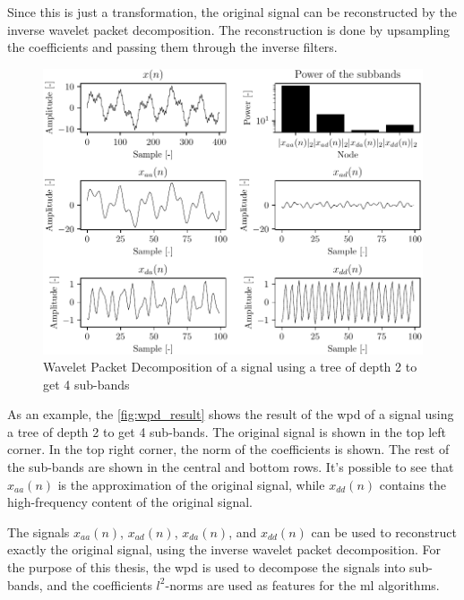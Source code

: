 Since this is just a transformation, the original signal can be reconstructed by the inverse wavelet packet decomposition. The reconstruction is done by upsampling the coefficients and passing them through the inverse filters.


\begin{figure}
\centering
\includegraphics{images/WPD_result.pdf}
\caption{Wavelet Packet Decomposition of a signal using a tree of depth 2 to get 4 sub-bands}
\label{fig:wpd_result}
\end{figure}

As an example, the \autoref{fig:wpd_result} shows the result of the \gls{wpd} of a signal using a tree of depth 2 to get 4 sub-bands. The original signal is shown in the top left corner. In the top right corner, the norm of the coefficients is shown. The rest of the sub-bands are shown in the central and bottom rows. It's possible to see that $x_{aa}(n)$ is the approximation of the original signal, while  $x_{dd}(n)$ contains the high-frequency content of the original signal. 

The signals $x_{aa}(n)$, $x_{ad}(n)$, $x_{da}(n)$, and $x_{dd}(n)$ can be used to reconstruct exactly the original signal, using the inverse wavelet packet decomposition. For the purpose of this thesis, the \gls{wpd} is used to decompose the signals into sub-bands, and the coefficients $l^2$-norms are used as features for the \gls{ml} algorithms.